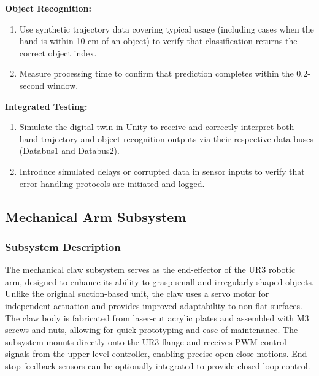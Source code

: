 \documentclass{senior-design}
\begin{document}
\textbf{Object Recognition:} 
\begin{enumerate}
    \item Use synthetic trajectory data covering typical usage (including cases when the hand is within 10 cm of an object) to verify that classification returns the correct object index. 
    \item Measure processing time to confirm that prediction completes within the 0.2-second window. 
\end{enumerate}
 
\textbf{Integrated Testing:}
\begin{enumerate}
    \item Simulate the digital twin in Unity to receive and correctly interpret both hand trajectory and object recognition outputs via their respective data buses (Databus1 and Databus2)\cite{MirCore2025}. 
    \item Introduce simulated delays or corrupted data in sensor inputs to verify that error handling protocols are initiated and logged. 
\end{enumerate}
\subsection{Mechanical Arm Subsystem}
\subsubsection*{Subsystem Description}
The mechanical claw subsystem serves as the end-effector of the UR3 robotic arm, designed to enhance its ability to grasp small and irregularly shaped objects. Unlike the original suction-based unit, the claw uses a servo motor for independent actuation and provides improved adaptability to non-flat surfaces. The claw body is fabricated from laser-cut acrylic plates and assembled with M3 screws and nuts, allowing for quick prototyping and ease of maintenance. The subsystem mounts directly onto the UR3 flange and receives PWM control signals from the upper-level controller, enabling precise open-close motions. End-stop feedback sensors can be optionally integrated to provide closed-loop control. 
\end{document}
